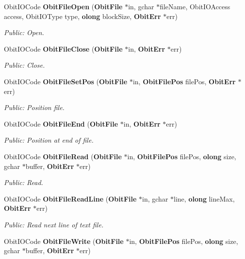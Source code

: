 \begin{CompactItemize}
Obit\-IOCode {\bf Obit\-File\-Open} ({\bf Obit\-File} $\ast$in, gchar $\ast$file\-Name, Obit\-IOAccess access, Obit\-IOType type, {\bf olong} block\-Size, {\bf Obit\-Err} $\ast$err)
\begin{CompactList}\small\item\em Public: Open. \item\end{CompactList}\item 
Obit\-IOCode {\bf Obit\-File\-Close} ({\bf Obit\-File} $\ast$in, {\bf Obit\-Err} $\ast$err)
\begin{CompactList}\small\item\em Public: Close. \item\end{CompactList}\item 
Obit\-IOCode {\bf Obit\-File\-Set\-Pos} ({\bf Obit\-File} $\ast$in, {\bf Obit\-File\-Pos} file\-Pos, {\bf Obit\-Err} $\ast$err)
\begin{CompactList}\small\item\em Public: Position file. \item\end{CompactList}\item 
Obit\-IOCode {\bf Obit\-File\-End} ({\bf Obit\-File} $\ast$in, {\bf Obit\-Err} $\ast$err)
\begin{CompactList}\small\item\em Public: Position at end of file. \item\end{CompactList}\item 
Obit\-IOCode {\bf Obit\-File\-Read} ({\bf Obit\-File} $\ast$in, {\bf Obit\-File\-Pos} file\-Pos, {\bf olong} size, gchar $\ast$buffer, {\bf Obit\-Err} $\ast$err)
\begin{CompactList}\small\item\em Public: Read. \item\end{CompactList}\item 
Obit\-IOCode {\bf Obit\-File\-Read\-Line} ({\bf Obit\-File} $\ast$in, gchar $\ast$line, {\bf olong} line\-Max, {\bf Obit\-Err} $\ast$err)
\begin{CompactList}\small\item\em Public: Read next line of text file. \item\end{CompactList}\item 
Obit\-IOCode {\bf Obit\-File\-Write} ({\bf Obit\-File} $\ast$in, {\bf Obit\-File\-Pos} file\-Pos, {\bf olong} size, gchar $\ast$buffer, {\bf Obit\-Err} $\ast$err)

\end{CompactItemize}
